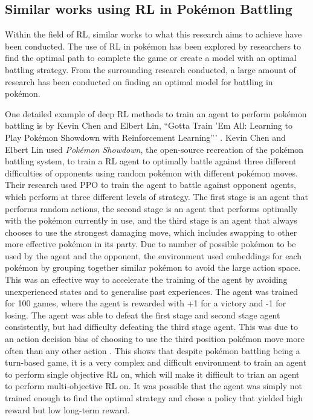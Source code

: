 \subsection{Similar works using RL in Pokémon Battling}

Within the field of RL, similar works to what this research aims to achieve have been conducted. The use of RL in pokémon has been explored by researchers to find the optimal path to complete the game or create a model with an optimal battling strategy. From the surrounding research conducted, a large amount of research has been conducted on finding an optimal model for battling in pokémon. 

One detailed example of deep RL methods to train an agent to perform pokémon battling is by Kevin Chen and Elbert Lin, ``Gotta Train 'Em All: Learning to Play Pokémon Showdown with Reinforcement Learning''' \cite{chen2018gotta}. Kevin Chen and Elbert Lin used \textit{Pokémon Showdown}, the open-source recreation of the pokémon battling system, to train a RL agent to optimally battle against three different difficulties of opponents using random pokémon with different pokémon moves. Their research used PPO to train the agent to battle against opponent agents, which perform at three different levels of strategy. The first stage is an agent that performs random actions, the second stage is an agent that performs optimally with the pokémon currently in use, and the third stage is an agent that always chooses to use the strongest damaging move, which includes swapping to other more effective pokémon in its party. Due to number of possible pokémon to be used by the agent and the opponent, the environment used embeddings for each pokémon by grouping together similar pokémon to avoid the large action space. This was an effective way to accelerate the training of the agent by avoiding unexperienced states and to generalise past experiences. The agent was trained for 100 games, where the agent is rewarded with +1 for a victory and -1 for losing. The agent was able to defeat the first stage and second stage agent consistently, but had difficulty defeating the third stage agent. This was due to an action decision bias of choosing to use the third position pokémon move more often than any other action \cite{chen2018gotta}. This shows that despite pokémon battling being a turn-based game, it is a very complex and difficult environment to train an agent to perform single objective RL on, which will make it difficult to trian an agent to perform multi-objective RL on. It was possible that the agent was simply not trained enough to find the optimal strategy and chose a policy that yielded high reward but low long-term reward. 

